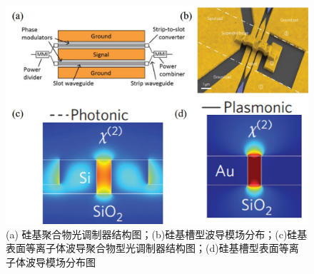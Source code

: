 \begin{figure}[htb]
	\centering
	\includegraphics[width=12cm]{./Pictures/fig_polymer_mod.jpg}
	\caption{ (a) 硅基聚合物光调制器结构图\cite{palmer2014high}；(b)硅基槽型波导模场分布\cite{palmer2014high}；(c)硅基表面等离子体波导聚合物型光调制器结构图\cite{heni2015high}；(d)硅基槽型表面等离子体波导模场分布图\cite{heni2015high}}
	\label{fig_polymer_mod}
\end{figure}

